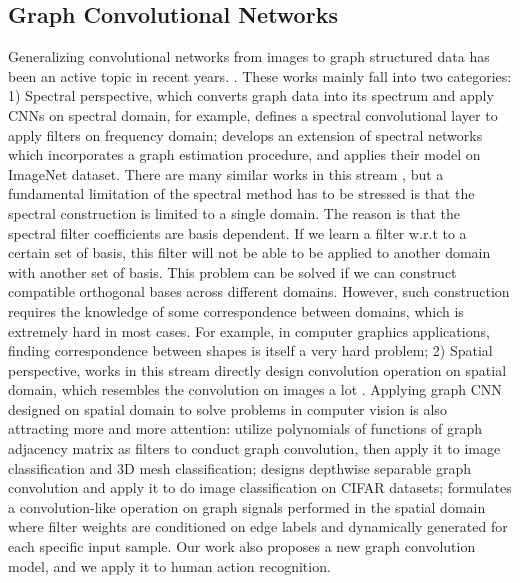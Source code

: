 \documentclass[a4paper,11pt]{article}
\begin{document}
\subsection{Graph Convolutional Networks}
Generalizing convolutional networks from images to graph structured data has been an active topic in recent years. \cite{bruna2013spectral,henaff2015deep,li2017skeleton,niepert2016learning}. These works mainly fall into two categories: 1) Spectral perspective, which converts graph data into its spectrum and apply CNNs on spectral domain, for example, \cite{bruna2013spectral} defines a spectral convolutional layer to apply filters on frequency domain; \cite{henaff2015deep} develops an extension of spectral networks which incorporates a graph estimation procedure, and applies their model on ImageNet dataset. There are many similar works in this stream \cite{duvenaud2015convolutional,li2015gated,kipf2016semi}, but a fundamental limitation of the spectral method has to be stressed is that the spectral construction is limited to a single domain. The reason is that the spectral filter coefficients are basis dependent. If we learn a filter w.r.t to a certain set of basis, this filter will not be able to be applied to another domain with another set of basis. This problem can be solved if we can construct compatible orthogonal bases across different domains. However, such construction requires the knowledge of some correspondence between domains, which is extremely hard in most cases. For example, in computer graphics applications, finding correspondence between shapes is itself a very hard problem; 2) Spatial perspective, works in this stream directly design convolution operation on spatial domain, which resembles the convolution on images a lot \cite{li2015gated,scarselli2009graph}. Applying graph CNN designed on spatial domain to solve problems in computer vision is also attracting more and more attention: \cite{such2017robust} utilize polynomials of functions of graph adjacency matrix as filters to conduct graph convolution, then apply it to image classification and 3D mesh classification; \cite{lai2017learning} designs depthwise separable graph convolution and apply it to do image classification on CIFAR datasets; \cite{simonovsky2017dynamic} formulates a convolution-like operation on graph signals performed in the spatial domain where filter weights are conditioned on edge labels and dynamically generated for each specific input sample. Our work also proposes a new graph convolution model, and we apply it to human action recognition.
\end{document}
